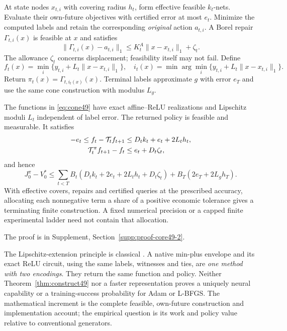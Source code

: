 At state nodes $x_{t,i}$ with covering radius $h_t$, form effective feasible $k_t$-nets. Evaluate their own-future objectives with certified error at most $e_t$. Minimize the computed labels and retain the corresponding \emph{original} action $a_{t,i}$. A Borel repair $\Gamma_{t,i}(x)$ is feasible at $x$ and satisfies
\begin{equation}\label{eq:repair49}
 \|\Gamma_{t,i}(x)-a_{t,i}\|_1\le K_t^A\|x-x_{t,i}\|_1+\zeta_t.
\end{equation}
The allowance $\zeta_t$ concerns displacement; feasibility itself may not fail. Define
\begin{equation}\label{eq:cone49}
 f_t(x)=\min_i\{y_{t,i}+L_t\|x-x_{t,i}\|_1\},\quad
 i_t(x)=\min\arg\min_i\{y_{t,i}+L_t\|x-x_{t,i}\|_1\}.
\end{equation}
Return $\pi_t(x)=\Gamma_{t,i_t(x)}(x)$. Terminal labels approximate $g$ with error $e_T$ and use the same cone construction with modulus $L_g$.

\begin{theorem}\label{thm:construct49}
The functions in \eqref{eq:cone49} have exact affine--ReLU realizations and Lipschitz moduli $L_t$ independent of label error. The returned policy is feasible and measurable. It satisfies
\begin{align}\label{eq:enclosures49}
 -e_t\le f_t-\mathcal T_tf_{t+1}&\le D_tk_t+e_t+2L_th_t,\\
 \mathcal T_t^\pi f_{t+1}-f_t&\le e_t+D_t\zeta_t,\notag
\end{align}
and hence
\begin{equation}\label{eq:constructionloss49}
 J_0^\pi-V_0^*\le
 \sum_{t<T}B_t(D_tk_t+2e_t+2L_th_t+D_t\zeta_t)
 +B_T(2e_T+2L_gh_T).
\end{equation}
With effective covers, repairs and certified queries at the prescribed accuracy, allocating each nonnegative term a share of a positive economic tolerance gives a terminating finite construction. A fixed numerical precision or a capped finite experimental ladder need not contain that allocation.
\end{theorem}
\noindent The proof is in Supplement, Section~\ref{supp:proof-core49-2}.


The Lipschitz-extension principle is classical \citep{mcshane1934}. A native min-plus envelope and its exact ReLU circuit, using the same labels, witnesses and ties, are \emph{one method with two encodings}. They return the same function and policy. Neither Theorem~\ref{thm:construct49} nor a faster representation proves a uniquely neural capability or a training-success probability for Adam or L-BFGS. The mathematical increment is the complete feasible, own-future construction and implementation account; the empirical question is its work and policy value relative to conventional generators.

